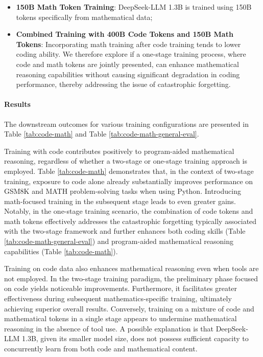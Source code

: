 \begin{itemize}[topsep=0pt]
\begin{itemize}[topsep=0pt]
\begin{itemize}[topsep=0pt]
    \item \textbf{150B Math Token Training}: DeepSeek-LLM 1.3B is trained using 150B tokens specifically from mathematical data;
    \item \textbf{Combined Training with 400B Code Tokens and 150B Math Tokens}: Incorporating math training after code training tends to lower coding ability. We therefore explore if a one-stage training process, where code and math tokens are jointly presented, can enhance mathematical reasoning capabilities without causing significant degradation in coding performance, thereby addressing the issue of catastrophic forgetting.
\end{itemize}

\paragraph{Results}
The downstream outcomes for various training configurations are presented in Table \ref{tab:code-math} and Table \ref{tab:code-math-general-eval}.

Training with code contributes positively to program-aided mathematical reasoning, regardless of whether a two-stage or one-stage training approach is employed. Table \ref{tab:code-math} demonstrates that, in the context of two-stage training, exposure to code alone already substantially improves performance on GSM8K and MATH problem-solving tasks when using Python. Introducing math-focused training in the subsequent stage leads to even greater gains. Notably, in the one-stage training scenario, the combination of code tokens and math tokens effectively addresses the catastrophic forgetting typically associated with the two-stage framework and further enhances both coding skills (Table \ref{tab:code-math-general-eval}) and program-aided mathematical reasoning capabilities (Table \ref{tab:code-math}).

Training on code data also enhances mathematical reasoning even when tools are not employed. In the two-stage training paradigm, the preliminary phase focused on code yields noticeable improvements. Furthermore, it facilitates greater effectiveness during subsequent mathematics-specific training, ultimately achieving superior overall results. Conversely, training on a mixture of code and mathematical tokens in a single stage appears to undermine mathematical reasoning in the absence of tool use. A possible explanation is that DeepSeek-LLM 1.3B, given its smaller model size, does not possess sufficient capacity to concurrently learn from both code and mathematical content.


\end{itemize}
\end{itemize}
